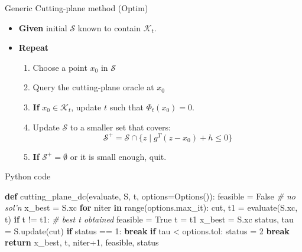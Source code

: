 \documentclass[10pt,ignorenonframetext,serif,onlymath]{beamer}
\newenvironment{Shaded}{}{}
\newcommand{\BuiltInTok}[1]{#1}
\newcommand{\CommentTok}[1]{\textcolor[rgb]{0.38,0.63,0.69}{\textit{#1}}}
\newcommand{\ControlFlowTok}[1]{\textcolor[rgb]{0.00,0.44,0.13}{\textbf{#1}}}
\newcommand{\DecValTok}[1]{\textcolor[rgb]{0.25,0.63,0.44}{#1}}
\newcommand{\KeywordTok}[1]{\textcolor[rgb]{0.00,0.44,0.13}{\textbf{#1}}}
\newcommand{\NormalTok}[1]{#1}
\newcommand{\OperatorTok}[1]{\textcolor[rgb]{0.40,0.40,0.40}{#1}}
\newcommand{\VariableTok}[1]{\textcolor[rgb]{0.10,0.09,0.49}{#1}}
\providecommand{\tightlist}{%
  \setlength{\itemsep}{0pt}\setlength{\parskip}{0pt}}
\begin{document}
\begin{frame}{Generic Cutting-plane method (Optim)}
\protect\hypertarget{sec:generic-cutting-plane-method-optim}{}

\begin{itemize}
\tightlist
\item
  \textbf{Given} initial \(\mathcal{S}\) known to contain
  \(\mathcal{K}_t\).
\item
  \textbf{Repeat}

  \begin{enumerate}
  [1.]
  \tightlist
  \item
    Choose a point \(x_0\) in \(\mathcal{S}\)
  \item
    Query the cutting-plane oracle at \(x_0\)
  \item
    \textbf{If} \(x_0 \in \mathcal{K}_t\), update \(t\) such that
    \(\Phi_t(x_0) = 0\).
  \item
    Update \(\mathcal{S}\) to a smaller set that covers:
    \[\mathcal{S}^+ = \mathcal{S} \cap \{z \mid g^T (z - x_0) + h \leq 0\} \]
  \item
    \textbf{If} \(\mathcal{S}^+ = \emptyset\) or it is small enough,
    quit.
  \end{enumerate}
\end{itemize}

\end{frame}

\begin{frame}[fragile]{Python code}
\protect\hypertarget{sec:python-code-2}{}

\begin{Shaded}
\begin{Highlighting}[]
\KeywordTok{def}\NormalTok{ cutting_plane_dc(evaluate, S, t, options}\OperatorTok{=}\NormalTok{Options()):}
\NormalTok{    feasible }\OperatorTok{=} \VariableTok{False}  \CommentTok{# no sol'n}
\NormalTok{    x_best }\OperatorTok{=}\NormalTok{ S.xc}
    \ControlFlowTok{for}\NormalTok{ niter }\KeywordTok{in} \BuiltInTok{range}\NormalTok{(options.max_it):}
\NormalTok{        cut, t1 }\OperatorTok{=}\NormalTok{ evaluate(S.xc, t)}
        \ControlFlowTok{if}\NormalTok{ t }\OperatorTok{!=}\NormalTok{ t1:  }\CommentTok{# best t obtained}
\NormalTok{            feasible }\OperatorTok{=} \VariableTok{True}
\NormalTok{            t }\OperatorTok{=}\NormalTok{ t1}
\NormalTok{            x_best }\OperatorTok{=}\NormalTok{ S.xc}
\NormalTok{        status, tau }\OperatorTok{=}\NormalTok{ S.update(cut)}
        \ControlFlowTok{if}\NormalTok{ status }\OperatorTok{==} \DecValTok{1}\NormalTok{:}
            \ControlFlowTok{break}
        \ControlFlowTok{if}\NormalTok{ tau }\OperatorTok{<}\NormalTok{ options.tol:}
\NormalTok{            status }\OperatorTok{=} \DecValTok{2}
            \ControlFlowTok{break}
    \ControlFlowTok{return}\NormalTok{ x_best, t, niter}\OperatorTok{+}\DecValTok{1}\NormalTok{, feasible, status}
\end{Highlighting}
\end{Shaded}

\end{frame}
\end{document}
